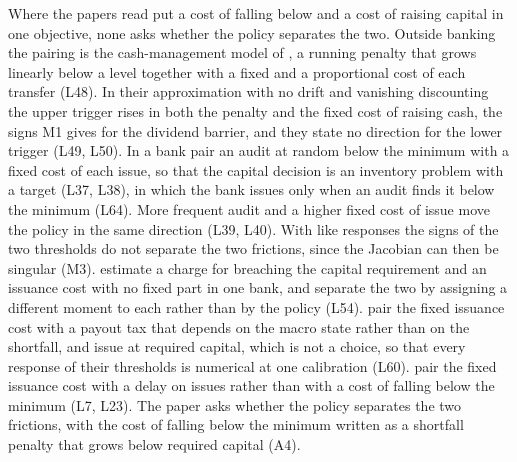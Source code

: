 Where the papers read put a cost of falling below and a cost of raising
capital in one objective, none asks whether the policy separates the two.
Outside banking the pairing is
the cash-management model of \citet{constantinides1978}, a running penalty
that grows linearly below a level together with a fixed and a proportional
cost of each transfer (L48). In their approximation with no drift and
vanishing discounting the upper trigger rises in both the penalty and the
fixed cost of raising cash, the signs M1 gives for the dividend barrier, and
they state no direction for the lower trigger (L49, L50). In a bank
\citet{milnewhalley2001} pair an audit at random below the minimum with a fixed
cost of each issue, so that the capital decision is an inventory problem with
a target (L37, L38), in which the bank issues only when an audit finds it
below the minimum (L64). More frequent audit and a higher fixed cost of issue
move the policy in the same direction (L39, L40). With
like responses the signs of the two thresholds do not separate the two
frictions, since the Jacobian can then be singular (M3). \citet{behn2019}
estimate a charge for breaching the capital requirement and an issuance cost with no
fixed part in one bank, and separate the two by assigning a different moment
to each rather than by the policy (L54). \citet{federico2026} pair the fixed
issuance cost with a payout tax that depends on the macro state rather than on
the shortfall, and issue at required capital, which is not a choice, so that
every response of their thresholds is numerical at one calibration (L60).
\citet{peura2006} pair the fixed
issuance cost with a delay on issues rather than with a cost of falling below
the minimum (L7, L23). The paper asks whether the policy separates the two
frictions, with the cost of falling below the minimum written as a shortfall
penalty that grows below required capital (A4).

